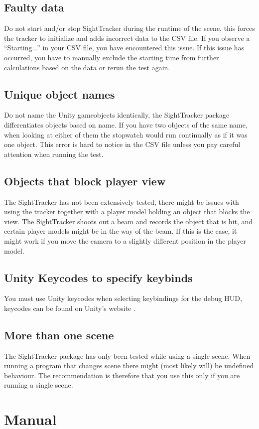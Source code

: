 \documentclass[letterpaper]{article}
\begin{document}
\subsection{Faulty data}
Do not start and/or stop SightTracker during the runtime of the scene, this forces the tracker to initialize and adds incorrect data to the CSV file. If you observe a “Starting...” in your CSV file, you have encountered this issue. If this issue has occurred, you have to manually exclude the starting time from further calculations based on the data or rerun the test again.
\subsection{Unique object names}
Do not name the Unity gameobjects identically, the SightTracker package differentiates objects based on name. If you have two objects of the same name, when looking at either of them the stopwatch would run continually as if it was one object. This error is hard to notice in the CSV file unless you pay careful attention when running the test.
\subsection{Objects that block player view}
The SightTracker has not been extensively tested, there might be issues with using the tracker together with a player model holding an object that blocks the view. The SightTracker shoots out a beam and records the object that is hit, and certain player models might be in the way of the beam. If this is the case, it might work if you move the camera to a slightly different position in the player model.
\subsection{Unity Keycodes to specify keybinds}
You must use Unity keycodes when selecting keybindings for the debug HUD, keycodes can be found on Unity's website \cite{unitykeycode}.
\subsection{More than one scene}
The SightTracker package has only been tested while using a single scene. When running a program that changes scene there might (most likely will) be undefined behaviour. The recommendation is therefore that you use this only if you are running a single scene.
\newpage
\section{Manual}
\end{document}
